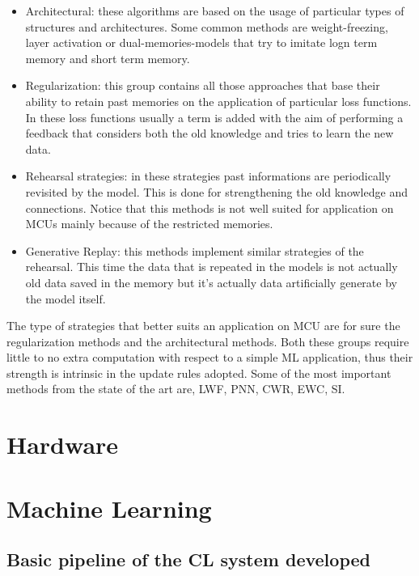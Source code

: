 \documentclass[12pt]{report}
\begin{document}
\begin{itemize}
\item Architectural: these algorithms are based on the usage of particular types of structures and architectures. Some common methods are weight-freezing, layer activation or dual-memories-models that try to imitate logn term memory and short term memory.
\item Regularization: this group contains all those approaches that base their ability to retain past memories on the application of particular loss functions. In these loss functions usually a term is added with the aim of performing a feedback that considers both the old knowledge and tries to learn the new data.
\item Rehearsal strategies: in these strategies past informations are periodically revisited by the model. This is done for strengthening the old knowledge and connections. Notice that this methods is not well suited for application on MCUs mainly because of the restricted memories. 
\item Generative Replay: this methods implement similar strategies of the rehearsal. This time the data that is repeated in the models is not actually old data saved in the memory but it's actually data artificially generate by the model itself. 
\end{itemize} 

The type of strategies that better suits an application on MCU are for sure the regularization methods and the architectural methods. Both these groups require little to no extra computation with respect to a simple ML application, thus their strength is intrinsic in the update rules adopted. Some of the most important methods from the state of the art are, LWF, PNN, CWR, EWC, SI. 









\chapter{Hardware} 








\chapter{Machine Learning}

\section{Basic pipeline of the CL system developed}
\end{document}
